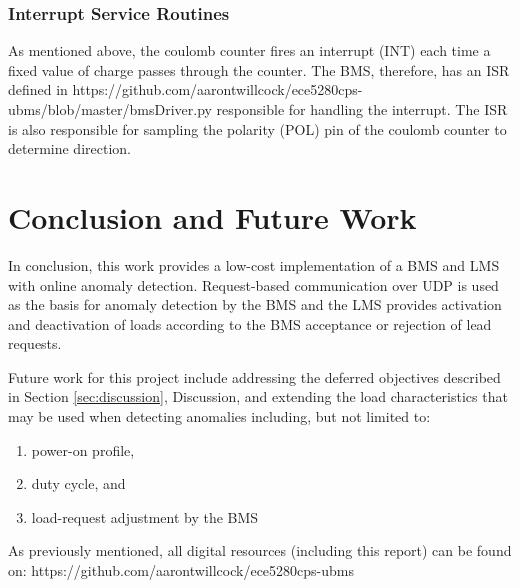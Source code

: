 \documentclass[11pt,conference,draftcls,onecolumn]{IEEEtran}
\begin{document}
\subsubsection{Interrupt Service Routines}
As mentioned above, the coulomb counter fires an interrupt (INT) each time a fixed value of charge passes through the counter.
The BMS, therefore, has an ISR defined in https://github.com/aarontwillcock/ece5280cps-ubms/blob/master/bmsDriver.py responsible for handling the interrupt.
The ISR is also responsible for sampling the polarity (POL) pin of the coulomb counter to determine direction.

\section{Conclusion and Future Work}\label{sec:conclusion}
In conclusion, this work provides a low-cost implementation of a BMS and LMS with online anomaly detection.
Request-based communication over UDP is used as the basis for anomaly detection by the BMS and the LMS provides activation and deactivation of loads according to the BMS acceptance or rejection of lead requests.

Future work for this project include addressing the deferred objectives described in Section \ref{sec:discussion}, Discussion, and extending the load characteristics that may be used when detecting anomalies including, but not limited to:
\begin{enumerate}
    \item power-on profile,
    \item duty cycle, and
    \item load-request adjustment by the BMS
\end{enumerate}

As previously mentioned, all digital resources (including this report) can be found on:
https://github.com/aarontwillcock/ece5280cps-ubms



\end{document}
